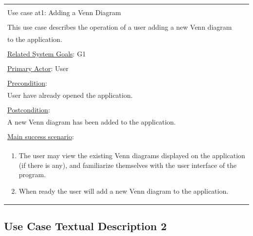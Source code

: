 \documentclass[fontsize=12pt,paper=letter,twoside]{scrartcl}
\begin{document}
\begin{table}[h]
	\begin{tabular}{|l|}
		\hline
		\\
		Use case at1: Adding a Venn Diagram													\\
		\\
		This use case describes the operation of a user adding a new Venn diagram 			\\
		to the application. 																\\
		\\
		\underline{Related System Goals}: G1												\\
		\\
		\underline{Primary Actor}: User														\\
		\\
		\underline{Precondition}:															\\ \qquad
		User have already opened the application. 											\\
		\\
		\underline{Postcondition}:															\\ \qquad
		A new Venn diagram has been added to the application.								\\
		\\
		\underline{Main success scenario}:													\\
		\begin{minipage}{6in}
			\vskip 4pt
			\begin{enumerate}
				\item The user may view the existing Venn diagrams displayed on the application
						(if there is any), and familiarize themselves with the user interface
						of the program.
				\item When ready the user will add a new Venn diagram to the application.
			\end{enumerate}
			\vskip 4pt
		\end{minipage}
		\\
		\hline
	\end{tabular}
\end{table}

\newpage

\subsection*{Use Case Textual Description 2}
\end{document}
